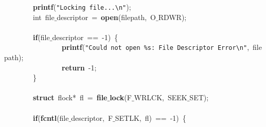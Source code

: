 \mbox{}\ \ \ \ \ \ \ \ \textbf{printf}(\texttt{"{}Locking\ file...}\texttt{\textbackslash{}n}\texttt{"{}}); \\
\mbox{}\ \ \ \ \ \ \ \ int\ file$\_$descriptor\ =\ \textbf{open}(filepath,\ O$\_$RDWR); \\
\mbox{}\ \ \ \ \ \ \ \  \\
\mbox{}\ \ \ \ \ \ \ \ \textbf{if}(file$\_$descriptor\ ==\ -1)\ \{ \\
\mbox{}\ \ \ \ \ \ \ \ \ \ \ \ \ \ \ \ \textbf{printf}(\texttt{"{}Could\ not\ open\ \%s:\ File\ Descriptor\ Error}\texttt{\textbackslash{}n}\texttt{"{}},\ filepath); \\
\mbox{}\ \ \ \ \ \ \ \ \ \ \ \ \ \ \ \ \textbf{return}\ -1; \\
\mbox{}\ \ \ \ \ \ \ \ \} \\
\mbox{} \\
\mbox{}\ \ \ \ \ \ \ \ \textbf{struct}\ flock*\ fl\ =\ \textbf{file$\_$lock}(F$\_$WRLCK,\ SEEK$\_$SET); \\
\mbox{}\ \ \ \ \ \ \ \  \\
\mbox{}\ \ \ \ \ \ \ \ \textbf{if}(\textbf{fcntl}(file$\_$descriptor,\ F$\_$SETLK,\ fl)\ ==\ -1)\ \{ \\
